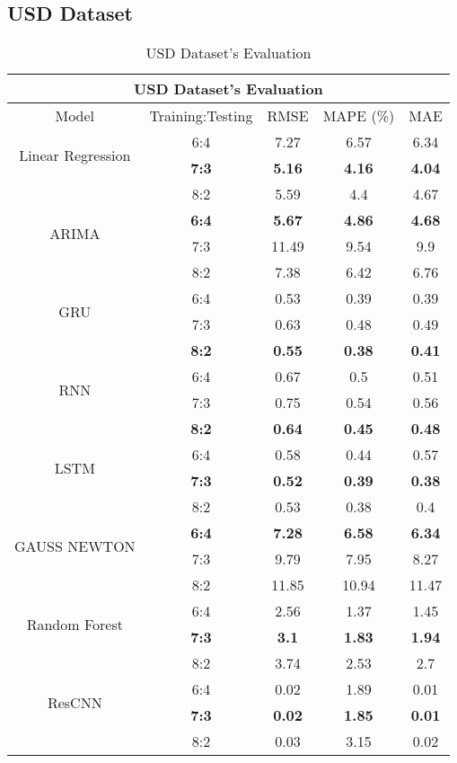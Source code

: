 \documentclass{ieeeojies}
\begin{document}
\subsection{USD Dataset} 
\begin{table}[H]
    \centering
    \caption{USD Dataset's Evaluation}
    \begin{tabular}{|c|c|c|c|c|}
         \hline
         \multicolumn{5}{|c|}{\textbf{USD Dataset's Evaluation}}\\
         \hline
         \centering Model & Training:Testing & RMSE & MAPE (\%) & MAE\\
         \hline
         \multirow{2}{*}{Linear Regression} & 6:4 & 7.27 & 6.57 & 6.34 \\ & \textbf{7:3} & \textbf{5.16} & \textbf{4.16} & \textbf{4.04}\\ & 8:2 & 5.59 & 4.4 & 4.67 \\
         \hline
         \multirow{2}{*}{ARIMA} & \textbf{6:4} & \textbf{5.67} & \textbf{4.86} & \textbf{4.68}\\ & 7:3 & 11.49 & 9.54 & 9.9 \\ & 8:2 & 7.38 & 6.42 & 6.76 \\
         \hline
         \multirow{2}{*}{GRU} & 6:4 & 0.53 & 0.39 & 0.39 \\ & 7:3 & 0.63 & 0.48 & 0.49 \\ & \textbf{8:2} & \textbf{0.55} & \textbf{0.38} & \textbf{0.41}\\
         \hline
         \multirow{2}{*}{RNN} & 6:4 & 0.67 & 0.5 & 0.51 \\ & 7:3 & 0.75 & 0.54 & 0.56 \\ & \textbf{8:2} & \textbf{0.64} & \textbf{0.45} & \textbf{0.48}\\
         \hline
          \multirow{2}{*}{LSTM} & 6:4 & 0.58 & 0.44 & 0.57 \\ & \textbf{7:3} & \textbf{0.52} & \textbf{0.39} & \textbf{0.38}\\ & 8:2 & 0.53 & 0.38 & 0.4 \\
         \hline
         \multirow{2}{*}{GAUSS NEWTON} & \textbf{6:4} & \textbf{7.28} & \textbf{6.58} & \textbf{6.34}\\ & 7:3 & 9.79 & 7.95 & 8.27 \\ & 8:2 & 11.85	& 10.94 & 11.47 \\
         \hline
         \multirow{2}{*}{Random Forest} & 6:4 & 2.56 & 1.37 & 1.45 \\ & \textbf{7:3} & \textbf{3.1} & \textbf{1.83} & \textbf{1.94}\\ & 8:2 & 3.74 & 2.53 & 2.7 \\
         \hline
        \multirow{2}{*}{ResCNN} & 6:4 & 0.02 & 1.89 & 0.01 \\ & \textbf{7:3} & \textbf{0.02} & \textbf{1.85} & \textbf{0.01}\\ & 8:2 & 0.03 & 3.15 & 0.02 \\
         \hline
    \end{tabular}
    \label{nasdaqresult}
\end{table}
\end{document}
